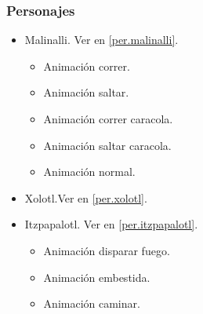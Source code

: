 \documentclass[11pt,letterpaper]{article}
\begin{document}
\begin{itemize}
        \subsubsection{Personajes}
        \begin{itemize}
                \item Malinalli. Ver en \ref{per.malinalli}.
                \begin{itemize}
                        \item Animación correr.
                        \item Animación saltar.
                        \item Animación correr caracola.
                        \item Animación saltar caracola.
                        \item Animación normal.
                \end{itemize}
                \item Xolotl.Ver en \ref{per.xolotl}.
                \item Itzpapalotl. Ver en \ref{per.itzpapalotl}.
                \begin{itemize}
                        \item Animación disparar fuego.
                        \item Animación embestida.
                        \item Animación caminar.
                \end{itemize}
        \end{itemize}

\end{itemize}
\end{document}
